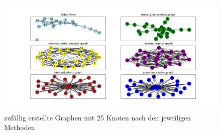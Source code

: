 \FloatBarrier
\begin{figure}[h!]
    \centering
    \hspace*{-1.5cm}
    \includegraphics[width=1.2\textwidth]{Graphics/6Random.png}
    \caption{zufällig erstellte Graphen mit 25 Knoten nach den jeweiligen Methoden}
    \label{RandomGraphen}
\end{figure}
\newpage

